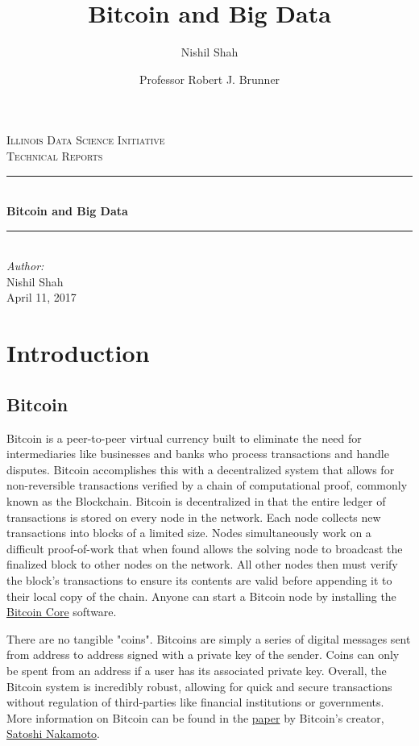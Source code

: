 \documentclass[9pt,twocolumn,twoside]{idsi}
\author[1,3]{Nishil Shah}
\author[2,3]{Professor Robert J. Brunner}
\affil[1]{National Center For Supercomputing Applications (NCSA)}
\affil[2]{Laboratory for Computation, Data, and Machine Learning}
\affil[3]{Illinois Data Science Initiative}
\title{Bitcoin and Big Data}
\newcommand{\HRule}{\rule{\linewidth}{0.5mm}}
\begin{document}
\begin{titlepage}
\center
\textsc{\LARGE Illinois Data Science Initiative}\\[1.5cm]
\textsc{\Large Technical Reports}\\[0.5cm] \HRule \\[0.4cm]
{\huge \bfseries Bitcoin and Big Data } \\[0.4cm] \HRule \\[1.5cm]
\Large \emph{Author:}\\ Nishil Shah \\[3cm]
{\large April 11, 2017}\\[3cm] %
\vfill
\end{titlepage}
%

\maketitle

\section{Introduction}
\subsection{Bitcoin}
Bitcoin is a peer-to-peer virtual currency built to eliminate the need for intermediaries like businesses and banks who process transactions and handle disputes. Bitcoin accomplishes this with a decentralized system that allows for non-reversible transactions verified by a chain of computational proof, commonly known as the Blockchain. Bitcoin is decentralized in that the entire ledger of transactions is stored on every node in the network. Each node collects new transactions into blocks of a limited size. Nodes simultaneously work on a difficult proof-of-work that when found allows the solving node to broadcast the finalized block to other nodes on the network. All other nodes then must verify the block's transactions to ensure its contents are valid before appending it to their local copy of the chain. Anyone can start a Bitcoin node by installing the \href{https://bitcoin.org/en/bitcoin-core/}{Bitcoin Core} software.

There are no tangible "coins". Bitcoins are simply a series of digital messages sent from address to address signed with a private key of the sender. Coins can only be spent from an address if a user has its associated private key. Overall, the Bitcoin system is incredibly robust, allowing for quick and secure transactions without regulation of third-parties like financial institutions or governments. More information on Bitcoin can be found in the \href{https://bitcoin.org/bitcoin.pdf}{paper} by Bitcoin's creator, \href{https://en.wikipedia.org/wiki/Satoshi_Nakamoto}{Satoshi Nakamoto}.
\end{document}
